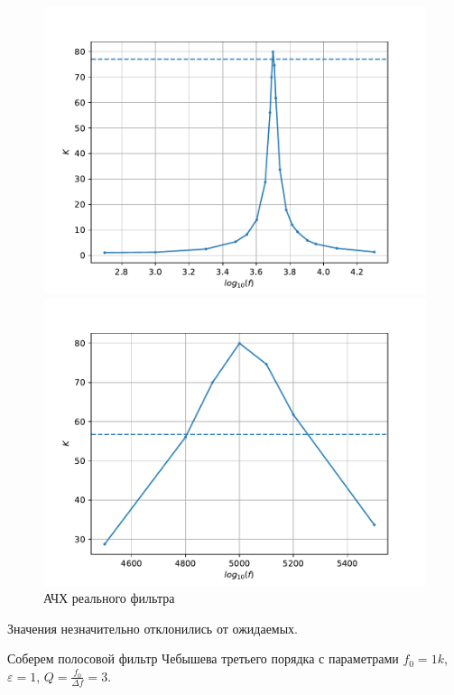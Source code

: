 \documentclass[12pt,a4paper]{article}
\begin{document}
	\begin{figure}[H]
		\centering
		\begin{minipage}[b]{.5\textwidth}
				\includegraphics[width=1\linewidth]{res/amp1bp_ach.pdf}
			\end{minipage}%
		\begin{minipage}[b]{.5\textwidth}
				\includegraphics[width=1\linewidth]{res/amp1bp_achscoped.pdf}
			\end{minipage}
		\caption{АЧХ реального фильтра}
	\end{figure}
	
	Значения незначительно отклонились от ожидаемых.
	
	Соберем полосовой фильтр Чебышева третьего порядка с параметрами $f_0 = 1k$, $\varepsilon = 1$, $Q = \frac{f_0}{\Delta f} = 3$.
	
\end{document}
